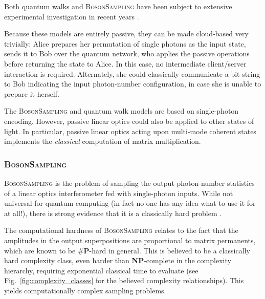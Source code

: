Both quantum walks and \textsc{BosonSampling} have been subject to extensive experimental investigation in recent years \cite{bib:PeruzzoQW, bib:Broome10, bib:Schreiber11b, bib:Owens11, bib:RohdeQWExp12, bib:Broome2012, bib:RohdeQWExp12, bib:Spring2, bib:Crespi3, bib:Tillmann4}.

Because these models are entirely passive, they can be made cloud-based very trivially: Alice prepares her permutation of single photons as the input state, sends it to Bob over the quantum network, who applies the passive operations before returning the state to Alice. In this case, no intermediate client/server interaction is required. Alternately, she could classically communicate a bit-string to Bob indicating the input photon-number configuration, in case she is unable to prepare it herself.

The \textsc{BosonSampling} and quantum walk models are based on single-photon encoding. However, passive linear optics could also be applied to other states of light. In particular, passive linear optics acting upon multi-mode coherent states implements the \textit{classical} computation of matrix multiplication.

%
%

\subsubsection{\textsc{BosonSampling}} \label{sec:BS} 

\textsc{BosonSampling} is the problem of sampling the output photon-number statistics of a linear optics interferometer fed with single-photon inputs. While not universal for quantum computing (in fact no one has any idea what to use it for at all!), there is strong evidence that it is a classically hard problem \cite{bib:AaronsonArkhipov10, bib:RohdeIntroBS15}.

The computational hardness of \textsc{BosonSampling} relates to the fact that the amplitudes in the output superpositions are proportional to matrix permanents, which are known to be \#\textbf{P}-hard in general. This is believed to be a classically hard complexity class, even harder than \textbf{NP}-complete in the complexity hierarchy, requiring exponential classical time to evaluate (see Fig.~\ref{fig:complexity_classes} for the believed complexity relationships). This yields computationally complex sampling problems.

%
%

